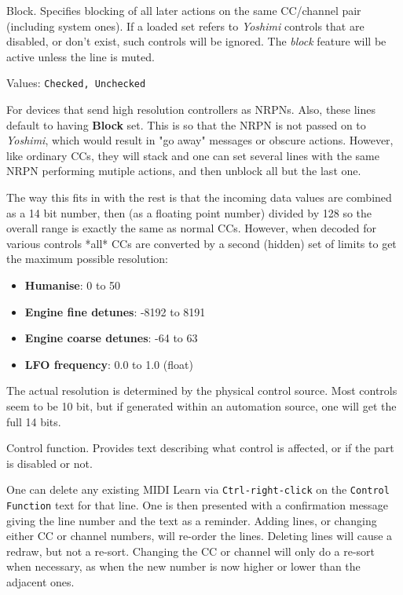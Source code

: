    Block.
   Specifies blocking of all later actions on the same CC/channel pair
   (including system ones).
   If a loaded set refers to \textsl{Yoshimi} controls that are disabled, or
   don't exist, such controls will be ignored.
   The \textsl{block} feature will be active unless the line is muted.

   Values: \texttt{Checked, Unchecked}

   For devices that send high resolution controllers as NRPNs.
   Also, these lines default to having \textbf{Block} set.
   This is so that the NRPN is
   not passed on to \textsl{Yoshimi}, which would result in "go away" messages
   or obscure actions. However, like ordinary CCs, they will stack and one can
   set several lines with the same NRPN performing mutiple actions, and then
   unblock all but the last one.

   The way this fits in with the rest is that the incoming data values are
   combined as a 14 bit number, then (as a floating point number) divided by
   128 so the overall range is exactly the same as normal CCs.  However, when
   decoded for various controls *all* CCs are converted by a second (hidden)
   set of limits to get the maximum possible resolution:

   \begin{itemize}
      \item \textbf{Humanise}: 0 to 50
      \item \textbf{Engine fine detunes}: -8192 to 8191
      \item \textbf{Engine coarse detunes}: -64 to 63
      \item \textbf{LFO frequency}: 0.0 to 1.0 (float)
   \end{itemize}

   The actual resolution is determined by the physical control
   source. Most controls seem to be 10 bit, but if generated within an
   automation source, one will get the full 14 bits.

   Control function.
   Provides text describing what control is affected, or if the
   part is disabled or not.

   One can delete any existing MIDI Learn via
   \texttt{Ctrl-right-click}
   on the
   \texttt{Control Function} text for that line.
   One is then presented with a confirmation message giving the line number and
   the text as a reminder.
   Adding lines, or changing either CC or channel numbers, will
   re-order the lines.
   Deleting lines will cause a redraw, but not a re-sort.
   Changing the CC or channel will only do a re-sort when necessary, as when the
   new number is now higher or lower than the adjacent ones.


